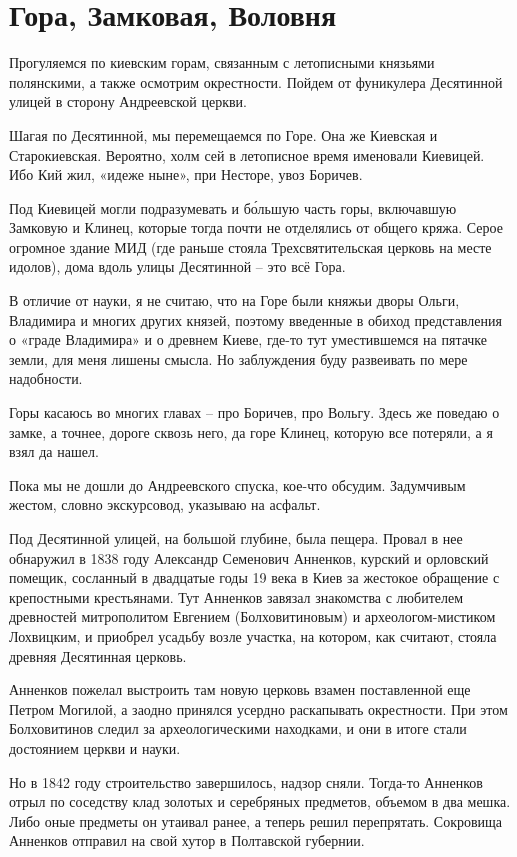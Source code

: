 \chapter{Гора, Замковая, Воловня}

Прогуляемся по киевским горам, связанным с летописными князьями полянскими, а также осмотрим окрестности. Пойдем от фуникулера  Десятинной улицей в сторону Андреевской церкви.

Шагая по Десятинной, мы перемещаемся по Горе. Она же Киевская и Старокиевская. Вероятно, холм сей в летописное время именовали Киевицей. Ибо Кий жил, «идеже ныне», при Несторе, увоз Боричев.

Под Киевицей могли подразумевать и б\'ольшую часть горы, включавшую Замковую и Клинец, которые тогда почти не отделялись от общего кряжа. Серое огромное здание МИД (где раньше стояла Трехсвятительская церковь на месте идолов), дома вдоль улицы Десятинной – это всё Гора.

В отличие от науки, я не считаю, что на Горе были княжьи дворы Ольги, Владимира и многих других князей, поэтому введенные в обиход представления о «граде Владимира» и о древнем Киеве, где-то тут уместившемся на пятачке земли, для меня лишены смысла. Но заблуждения буду развеивать по мере надобности.

Горы касаюсь во многих главах – про Боричев, про Вольгу. Здесь же поведаю о замке, а точнее, дороге сквозь него, да горе Клинец, которую все потеряли, а я взял да нашел.

Пока мы не дошли до Андреевского спуска, кое-что обсудим. Задумчивым жестом, словно экскурсовод, указываю на асфальт.

Под Десятинной улицей, на большой глубине, была пещера. Провал в нее обнаружил в 1838 году Александр Семенович Анненков, курский и орловский помещик, сосланный в двадцатые годы 19 века в Киев за жестокое обращение с крепостными крестьянами. Тут Анненков завязал знакомства с любителем древностей митрополитом Евгением (Болховитиновым) и археологом-мистиком Лохвицким, и приобрел усадьбу возле участка, на котором, как считают, стояла древняя Десятинная церковь.

Анненков пожелал выстроить там новую церковь взамен поставленной еще Петром Могилой, а заодно принялся усердно раскапывать окрестности. При этом Болховитинов следил за археологическими находками, и они в итоге стали достоянием церкви и науки.

Но в 1842 году строительство завершилось, надзор сняли. Тогда-то Анненков отрыл по соседству клад золотых и серебряных предметов, объемом в два мешка. Либо оные предметы он утаивал ранее, а теперь решил перепрятать. Сокровища Анненков отправил на свой хутор в Полтавской губернии.

